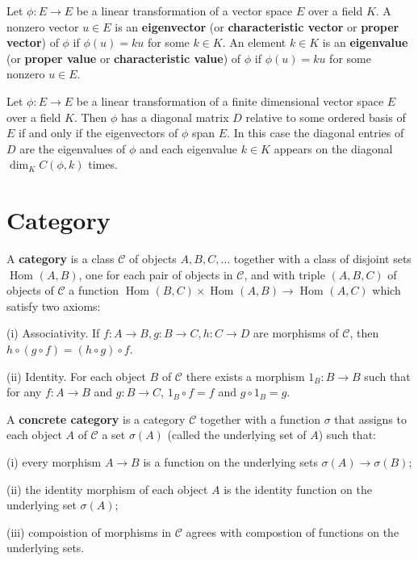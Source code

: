 \documentclass{article}
\DeclareMathOperator{\Hom}{Hom}
\begin{document}
\begin{definition}
    Let $\phi : E \to E$ be a linear transformation of a vector space $E$ over a field $K$. A nonzero vector $u \in E$ is an \textbf{eigenvector} (or \textbf{characteristic vector} or \textbf{proper vector}) of $\phi$ if $\phi(u) = ku$ for some $k \in K$. An element $k \in K$ is an \textbf{eigenvalue} (or \textbf{proper value} or \textbf{characteristic value}) of $\phi$ if $\phi(u) = ku$ for some nonzero $u \in E$.
\end{definition}

\begin{theorem}
    Let $\phi : E \to E$ be a linear transformation of a finite dimensional vector space $E$ over a field $K$. Then $\phi$ has a diagonal matrix $D$ relative to some ordered basis of $E$ if and only if the eigenvectors of $\phi$ span $E$. In this case the diagonal entries of $D$ are the eigenvalues of $\phi$ and each eigenvalue $k \in K$ appears on the diagonal $\dim_K C(\phi, k)$ times.
\end{theorem}
\newpage

\section{Category}
\begin{definition}
    A \textbf{category} is a class $\mathscr{C}$ of objects $A,B,C, \ldots$ together with a class of disjoint sets $\Hom_{}(A, B)$, one for each pair of objects in $\mathscr{C}$, and with triple $(A,B,C)$ of objects of $\mathscr{C}$ a function $\Hom_{}(B, C) \times \Hom_{}(A, B) \to \Hom_{}(A, C)$ which satisfy two axioms:

    (i) Associativity. If $f:A \to B, g:B\to C, h:C\to D$ are morphisms of $\mathscr{C}$, then $h \circ (g \circ f)=(h \circ g) \circ f$.
    
    (ii) Identity. For each object $B$ of $\mathscr{C}$ there exists a morphism $1_B:B\to B$ such that for any $f:A\to B$ and $g:B \to C$, $1_B \circ f=f$ and $g \circ 1_B=g$.
\end{definition}

\begin{definition}
    A \textbf{concrete category} is a category $\mathscr{C}$ together with a function $\sigma$ that assigns to each object $A$ of $\mathscr{C}$ a set $\sigma(A)$ (called the underlying set of $A$) such that:

    (i) every morphism $A\to B$ is a function on the underlying sets $\sigma(A)\to \sigma(B)$;

    (ii) the identity morphism of each object $A$ is the identity function on the underlying set $\sigma(A)$;

    (iii) compoistion of morphisms in $\mathscr{C}$ agrees with compostion of functions on the underlying sets.
\end{definition}
\end{document}
